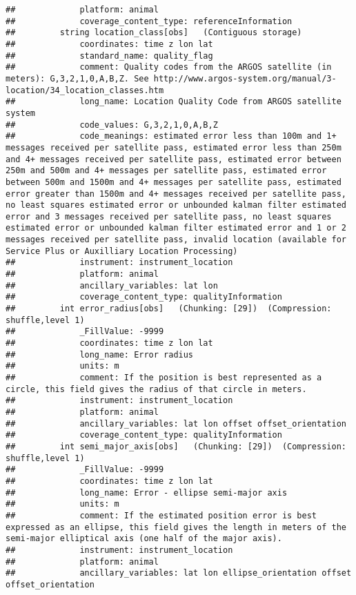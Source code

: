 \documentclass[
]{book}
\begin{document}
\begin{verbatim}
##             platform: animal
##             coverage_content_type: referenceInformation
##         string location_class[obs]   (Contiguous storage)  
##             coordinates: time z lon lat
##             standard_name: quality_flag
##             comment: Quality codes from the ARGOS satellite (in meters): G,3,2,1,0,A,B,Z. See http://www.argos-system.org/manual/3-location/34_location_classes.htm
##             long_name: Location Quality Code from ARGOS satellite system
##             code_values: G,3,2,1,0,A,B,Z
##             code_meanings: estimated error less than 100m and 1+ messages received per satellite pass, estimated error less than 250m and 4+ messages received per satellite pass, estimated error between 250m and 500m and 4+ messages per satellite pass, estimated error between 500m and 1500m and 4+ messages per satellite pass, estimated error greater than 1500m and 4+ messages received per satellite pass, no least squares estimated error or unbounded kalman filter estimated error and 3 messages received per satellite pass, no least squares estimated error or unbounded kalman filter estimated error and 1 or 2 messages received per satellite pass, invalid location (available for Service Plus or Auxilliary Location Processing)
##             instrument: instrument_location
##             platform: animal
##             ancillary_variables: lat lon
##             coverage_content_type: qualityInformation
##         int error_radius[obs]   (Chunking: [29])  (Compression: shuffle,level 1)
##             _FillValue: -9999
##             coordinates: time z lon lat
##             long_name: Error radius
##             units: m
##             comment: If the position is best represented as a circle, this field gives the radius of that circle in meters.
##             instrument: instrument_location
##             platform: animal
##             ancillary_variables: lat lon offset offset_orientation
##             coverage_content_type: qualityInformation
##         int semi_major_axis[obs]   (Chunking: [29])  (Compression: shuffle,level 1)
##             _FillValue: -9999
##             coordinates: time z lon lat
##             long_name: Error - ellipse semi-major axis
##             units: m
##             comment: If the estimated position error is best expressed as an ellipse, this field gives the length in meters of the semi-major elliptical axis (one half of the major axis).
##             instrument: instrument_location
##             platform: animal
##             ancillary_variables: lat lon ellipse_orientation offset offset_orientation

\end{verbatim}
\end{document}
